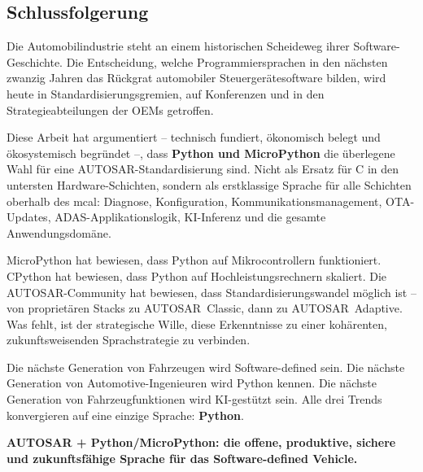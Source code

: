﻿\documentclass[12pt,a4paper,twoside]{article}
\begin{document}
\subsection{Schlussfolgerung}
\label{subsec:schluss}

Die Automobilindustrie steht an einem historischen Scheideweg ihrer
Software-Geschichte. Die Entscheidung, welche Programmiersprachen
in den nächsten zwanzig Jahren das Rückgrat automobiler Steuergerätesoftware
bilden, wird heute in Standardisierungsgremien, auf Konferenzen und
in den Strategieabteilungen der OEMs getroffen.

Diese Arbeit hat argumentiert -- technisch fundiert, ökonomisch belegt
und ökosystemisch begründet --, dass \textbf{Python und MicroPython}
die überlegene Wahl für eine AUTOSAR-Standardisierung sind.
Nicht als Ersatz für C in den untersten Hardware-Schichten, sondern
als erstklassige Sprache für alle Schichten oberhalb des \gls{mcal}:
Diagnose, Konfiguration, Kommunikationsmanagement, OTA-Updates,
ADAS-Applikationslogik, KI-Inferenz und die gesamte Anwendungsdomäne.

MicroPython hat bewiesen, dass Python auf Mikrocontrollern funktioniert.
CPython hat bewiesen, dass Python auf Hochleistungsrechnern skaliert.
Die AUTOSAR-Community hat bewiesen, dass Standardisierungswandel möglich ist --
von proprietären Stacks zu AUTOSAR~Classic, dann zu AUTOSAR~Adaptive.
Was fehlt, ist der strategische Wille, diese Erkenntnisse zu einer
kohärenten, zukunftsweisenden Sprachstrategie zu verbinden.

\medskip

Die nächste Generation von Fahrzeugen wird Software-defined sein.
Die nächste Generation von Automotive-Ingenieuren wird Python kennen.
Die nächste Generation von Fahrzeugfunktionen wird KI-gestützt sein.
Alle drei Trends konvergieren auf eine einzige Sprache: \textbf{Python}.

\medskip

\textbf{AUTOSAR + Python/MicroPython: die offene, produktive, sichere
und zukunftsfähige Sprache für das Software-defined Vehicle.}
\end{document}

